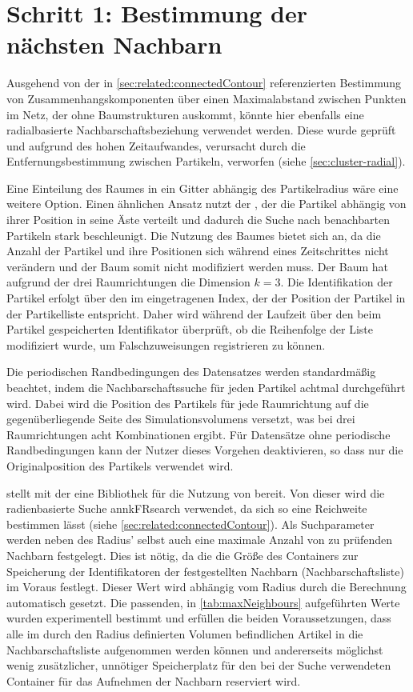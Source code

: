 \section{Schritt 1: Bestimmung der nächsten Nachbarn}\label{sec:nachbarschaftssuche}

Ausgehend von der in \autoref{sec:related:connectedContour} referenzierten Bestimmung von Zusammenhangskomponenten über einen Maximalabstand zwischen Punkten im Netz, der ohne Baumstrukturen auskommt, könnte hier ebenfalls eine radialbasierte Nachbarschaftsbeziehung verwendet werden. Diese wurde geprüft und aufgrund des hohen Zeitaufwandes, verursacht durch die Entfernungsbestimmung zwischen Partikeln, verworfen (siehe \autoref{sec:cluster-radial}).

Eine Einteilung des Raumes in ein Gitter abhängig des Partikelradius wäre eine weitere Option. Einen ähnlichen Ansatz nutzt der , der die Partikel abhängig von ihrer Position in seine Äste verteilt und dadurch die Suche nach benachbarten Partikeln stark beschleunigt. Die Nutzung des Baumes bietet sich an, da die Anzahl der Partikel und ihre Positionen sich während eines Zeitschrittes nicht verändern und der Baum somit nicht modifiziert werden muss. Der Baum hat aufgrund der drei Raumrichtungen die Dimension $k=3$. Die Identifikation der Partikel erfolgt über den im  eingetragenen Index, der der Position der Partikel in der Partikelliste entspricht. Daher wird während der Laufzeit über den beim Partikel gespeicherten Identifikator überprüft, ob die Reihenfolge der Liste modifiziert wurde, um Falschzuweisungen registrieren zu können.

Die periodischen Randbedingungen des Datensatzes werden standardmäßig beachtet, indem die Nachbarschaftssuche für jeden Partikel achtmal durchgeführt wird. Dabei wird die Position des Partikels für jede Raumrichtung auf die gegenüberliegende Seite des Simulationsvolumens versetzt, was bei drei Raumrichtungen acht Kombinationen ergibt.
Für Datensätze ohne periodische Randbedingungen kann der Nutzer dieses Vorgehen deaktivieren, so dass nur die Originalposition des Partikels verwendet wird.

 stellt mit der \ANN eine Bibliothek für die Nutzung von  bereit. Von dieser wird die radienbasierte Suche annkFRsearch verwendet, da sich so eine Reichweite bestimmen lässt (siehe \autoref{sec:related:connectedContour}). Als Suchparameter werden neben des Radius' selbst auch eine maximale Anzahl von zu prüfenden Nachbarn festgelegt. Dies ist nötig, da die \ANN die Größe des Containers zur Speicherung der Identifikatoren der festgestellten Nachbarn (Nachbarschaftsliste) im Voraus festlegt. Dieser Wert wird abhängig vom Radius durch die Berechnung automatisch gesetzt. Die passenden, in \autoref{tab:maxNeighbours} aufgeführten Werte wurden experimentell bestimmt und erfüllen die beiden Voraussetzungen, dass alle im durch den Radius definierten Volumen befindlichen Artikel in die Nachbarschaftsliste aufgenommen werden können und andererseits möglichst wenig zusätzlicher, unnötiger Speicherplatz für den bei der Suche verwendeten Container für das Aufnehmen der Nachbarn reserviert wird. 

